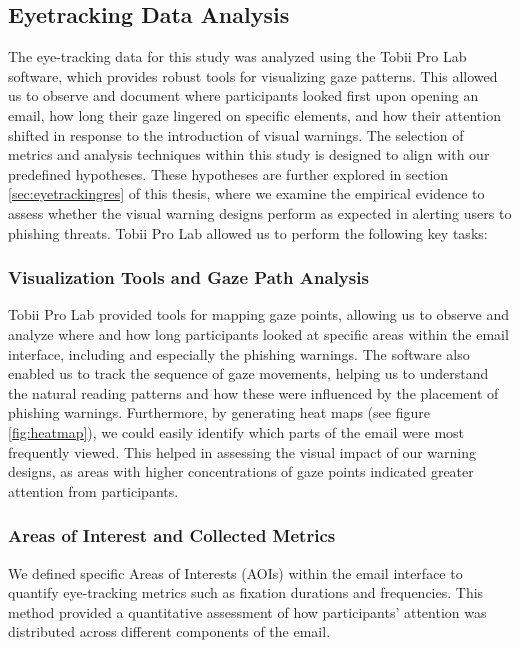 \documentclass[
  a4paper,  %
  twoside,  %
  bibliography=totoc,
  headsepline,
  cleardoublepage=empty,
  parskip=half,
  draft=false
]{scrbook}
\begin{document}
\subsection{Eyetracking Data Analysis} 
The eye-tracking data for this study was analyzed using the Tobii Pro Lab software, which provides robust tools for visualizing gaze patterns. This allowed us to observe and document where participants looked first upon opening an email, how long their gaze lingered on specific elements, and how their attention shifted in response to the introduction of visual warnings.  \newline
The selection of metrics and analysis techniques within this study is designed to align with our predefined hypotheses. These hypotheses are further explored in section \ref{sec:eyetrackingres} of this thesis, where we examine the empirical evidence to assess whether the visual warning designs perform as expected in alerting users to phishing threats. Tobii Pro Lab allowed us to perform the following key tasks:
\subsubsection{Visualization Tools and Gaze Path Analysis}
Tobii Pro Lab provided tools for mapping gaze points, allowing us to observe and analyze where and how long participants looked at specific areas within the email interface, including and especially the phishing warnings. The software also enabled us to track the sequence of gaze movements, helping us to understand the natural reading patterns and how these were influenced by the placement of phishing warnings.
Furthermore, by generating heat maps (see figure \ref{fig:heatmap}), we could easily identify which parts of the email were most frequently viewed. This helped in assessing the visual impact of our warning designs, as areas with higher concentrations of gaze points indicated greater attention from participants.

\subsubsection{Areas of Interest and Collected Metrics}
We defined specific Areas of Interests (AOIs) within the email interface to quantify eye-tracking metrics such as fixation durations and frequencies. This method provided a quantitative assessment of how participants' attention was distributed across different components of the email.
\end{document}
